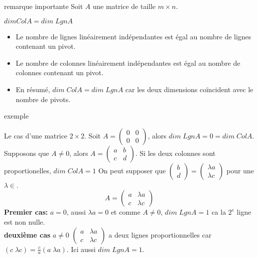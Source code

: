 
\begin{parag}
    

\begin{subparag}{remarque importante}
Soit $A$ une matrice de taille $m \times n$.
\begin{theoreme}

    $dim ColA = dim\; LgnA$

\end{theoreme}
\begin{itemize}
    \item Le nombre de lignes linéairement indépendantes est égal au nombre de lignes contenant un pivot.
    \item Le nombre de colonnes linéairement indépendantes est égal au nombre de colonnes contenant un pivot.
    \item En résumé, $dim\; ColA = dim\; LgnA$ car les deux dimensions coïncident avec le nombre de pivots.

\end{itemize}
    
\end{subparag}


\begin{subparag}{exemple}

Le cas d'une matrice $2\times 2$.
Soit $A =  \begin{pmatrix}
    0 & 0 \\ 0 & 0
\end{pmatrix}$, alors $dim\; LgnA = 0 = dim \; ColA$.\\
Supposons que $A \neq 0$, alors $A = \begin{pmatrix}
    a & b \\ c & d
\end{pmatrix}$. Si les deux colonnes sont proportionelles, $dim\; ColA = 1$  On peut supposer que $\begin{pmatrix}
    b \\ d
\end{pmatrix} = \begin{pmatrix}
    \lambda a \\ \lambda c
\end{pmatrix}$ pour une $\lambda \in $\R. 
\[A = \begin{pmatrix}
    a & \lambda a \\ c & \lambda c
\end{pmatrix}\]
\textbf{Premier cas:} $a = 0$, aussi $\lambda a = 0$ et comme $A \neq 0$, $dim \; LgnA = 1$ ca la $2^e$ ligne est non nulle.
\\
\textbf{deuxième cas} $a \neq 0$ $\begin{pmatrix}
    a & \lambda a \\ c & \lambda c
\end{pmatrix}  $ a deux lignes proportionnelles car $\left(c \; \lambda c\right) = \frac{c}{a}\left(a \; \lambda a\right)$. Ici aussi $dim \; LgnA = 1$.
    
\end{subparag}

\end{parag}

